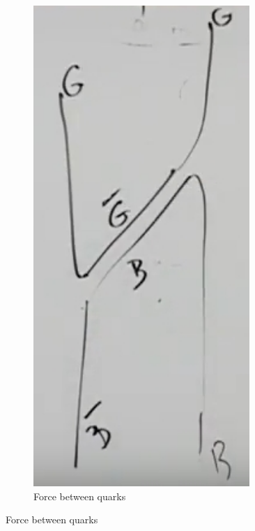 \documentclass[]{article}
\begin{document}
\begin{figure}[H]
	\caption{Photons cannot exchange photons, but gluons can exchange gluons.}\label{fig:quarks:gluons:forces}
	\begin{subfigure}[t]{0.45\textwidth}
		\caption{Force between quarks}
		\includegraphics[width=0.9\textwidth]{2-2-gluon7}

\end{subfigure}
\end{figure}
\end{document}
